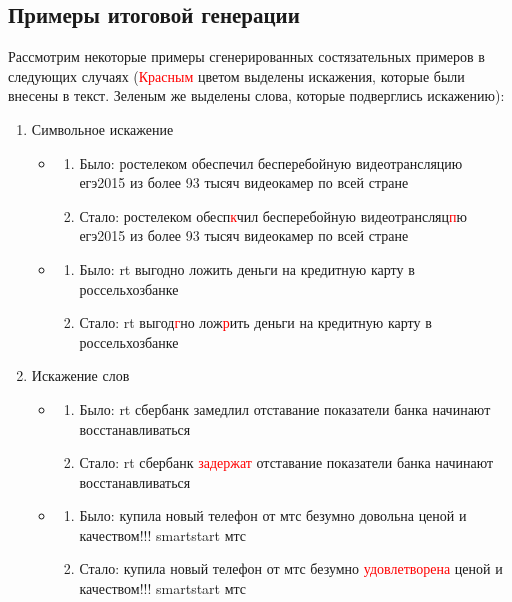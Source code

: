\subsection{Примеры итоговой генерации}
\noindent\hspace{0.6cm}Рассмотрим некоторые примеры сгенерированных состязательных примеров в следующих случаях (\textcolor{red}{Красным} цветом выделены искажения, которые были внесены в текст. \textcolor[RGB]{0,128,0}{Зеленым} же выделены слова, которые подверглись искажению):
\begin{enumerate}
    \item Символьное искажение

    \begin{itemize}
        \item
            \begin{enumerate}
                \item Было: ростелеком \textcolor[RGB]{0,128,0}{обеспечил} бесперебойную \textcolor[RGB]{0,128,0}{видеотрансляцию} егэ2015 из более 93 тысяч видеокамер по всей стране 
                \item Стало: ростелеком обесп\textcolor{red}{к}чил бесперебойную видеотрансляц\textcolor{red}{п}ю егэ2015 из более 93 тысяч видеокамер по всей стране 
            \end{enumerate}
        \item
            \begin{enumerate}
                \item Было: rt \textcolor[RGB]{0,128,0}{выгодно} \textcolor[RGB]{0,128,0}{ложить} деньги на кредитную карту в россельхозбанке
                \item Стало: rt выгод\textcolor{red}{г}но лож\textcolor{red}{р}ить деньги на кредитную карту в россельхозбанке
            \end{enumerate}
    \end{itemize}

    \item Искажение слов

    \begin{itemize}
        \item
            \begin{enumerate}
                \item Было: rt сбербанк \textcolor[RGB]{0,128,0}{замедлил} отставание показатели банка начинают восстанавливаться
                \item Стало: rt сбербанк \textcolor{red}{задержат} отставание показатели банка начинают восстанавливаться 
            \end{enumerate}
        \item
            \begin{enumerate}
                \item Было: купила новый телефон от мтс безумно \textcolor[RGB]{0,128,0}{довольна} ценой и качеством!!! smartstart мтс
                \item Стало: купила новый телефон от мтс безумно \textcolor{red}{удовлетворена} ценой и качеством!!! smartstart мтс
            \end{enumerate}
    \end{itemize}
    

\end{enumerate}
